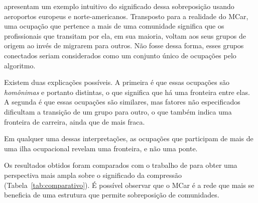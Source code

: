 \documentclass[
  article,
  11pt,
  a4paper,
  english,
  brazil,
  sumario=tradicional]{abntex2}
\begin{document}
 apresentam um exemplo intuitivo do significado dessa sobreposição usando aeroportos europeus e norte-americanos. Transposto para a realidade do MCar, uma ocupação que pertence a mais de uma comunidade significa que os profissionais que transitam por ela, em sua maioria, voltam aos seus grupos de origem ao invés de migrarem para outros. Não fosse dessa forma, esses grupos conectados seriam considerados como um conjunto único de ocupações pelo algoritmo.

Existem duas explicações possíveis. A primeira é que essas ocupações são \textit{homônimas} e portanto distintas, o que significa que há uma fronteira entre elas. A segunda é que essas ocupações são similares, mas fatores não especificados dificultam a transição de um grupo para outro, o que também indica uma fronteira de carreira, ainda que de mais fraca.

Em qualquer uma dessas interpretações, as ocupações que participam de mais de uma ilha ocupacional revelam uma fronteira, e não uma ponte.

Os resultados obtidos foram comparados com o trabalho de  para obter uma perspectiva mais ampla sobre o significado da compressão (Tabela~\ref{tab:comparativo}). É possível observar que o MCar é a rede que mais se beneficia de uma estrutura que permite sobreposição de comunidades.
\end{document}
